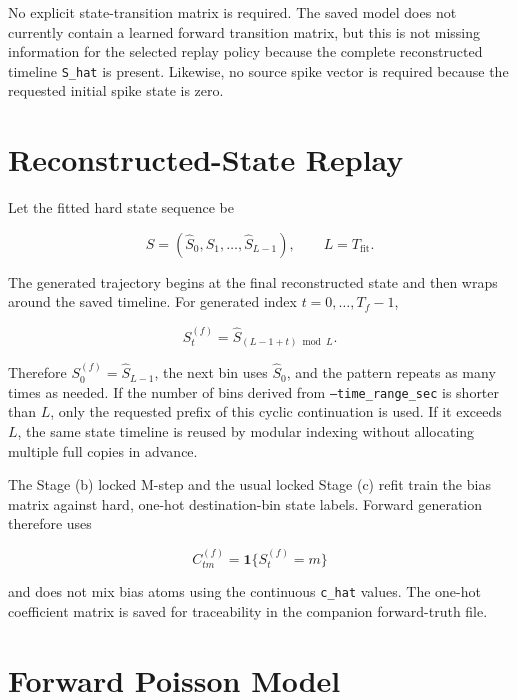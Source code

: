 \documentclass[11pt]{article}
\begin{document}
No explicit state-transition matrix is required. The saved model does not
currently contain a learned forward transition matrix, but this is not
missing information for the selected replay policy because the complete
reconstructed timeline \texttt{S\_hat} is present. Likewise, no source
spike vector is required because the requested initial spike state is zero.

\section{Reconstructed-State Replay}
\label{sec:state-replay}

Let the fitted hard state sequence be

\[
\hat S=(\hat S_0,\hat S_1,\ldots,\hat S_{L-1}),
\qquad L=T_{\mathrm{fit}}.
\]

The generated trajectory begins at the final reconstructed state and then
wraps around the saved timeline. For generated index
\(t=0,\ldots,T_f-1\),

\begin{equation}
\label{eq:state-wrap}
S^{(f)}_t = \hat S_{(L-1+t)\bmod L}.
\end{equation}

Therefore \(S^{(f)}_0=\hat S_{L-1}\), the next bin uses \(\hat S_0\), and
the pattern repeats as many times as needed. If the number of bins derived
from \texttt{--time\_range\_sec} is shorter than \(L\), only the requested
prefix of this cyclic continuation is used. If it exceeds \(L\), the same
state timeline is reused by modular indexing without allocating multiple
full copies in advance.

The Stage (b) locked M-step and the usual locked Stage (c) refit train the
bias matrix against hard, one-hot destination-bin state labels. Forward
generation therefore uses

\[
C^{(f)}_{tm}=\mathbf{1}\{S^{(f)}_t=m\}
\]

and does not mix bias atoms using the continuous \texttt{c\_hat} values.
The one-hot coefficient matrix is saved for traceability in the companion
forward-truth file.

\section{Forward Poisson Model}
\label{sec:model}
\end{document}
